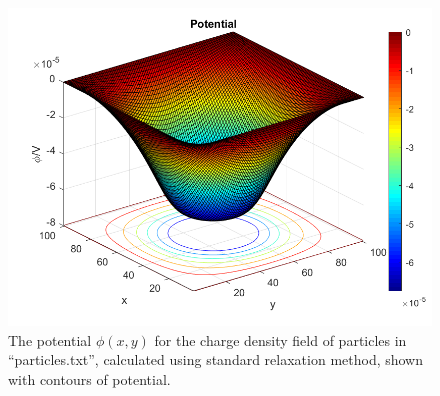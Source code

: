 \documentclass[12pt, graphicx]{article}
\begin{document}
\begin{figure}[ht]
\centering
\includegraphics[width = 140mm]{potentialc.png}
\caption{The potential $\phi(x,y)$ for the charge density field of particles in \textquotedblleft particles.txt\textquotedblright, calculated using standard relaxation method, shown with contours of potential.}
\label{fig:pot_relc}
\end{figure}
\end{document}
